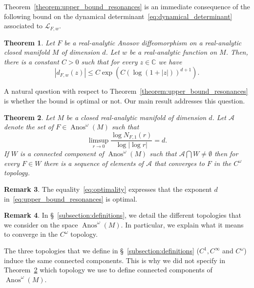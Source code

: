 \documentclass[10pt]{amsart}
\newtheorem{theo}{Theorem}[section]
\theoremstyle{definition}\newtheorem{defi}[theo]{Definition}\newtheorem{rema}[theo]{Remark}\newtheorem{exam}[theo]{Example}\newtheorem{exem}[theo]{Example}\newtheorem{nota}[theo]{Notation}
\DeclareMathOperator{\Anos}{Anos}
\newcommand{\p}[1]{\left(#1\right)}
\newcommand{\va}[1]{\left|#1\right|}
\newcommand{\clL}{\mathcal{L}}
\newcommand{\clA}{\mathcal{A}}
\newcommand{\bbC}{\mathbb{C}}
\begin{document}
Theorem~\ref{theorem:upper_bound_resonances} is an immediate consequence of the following bound on the dynamical determinant~\eqref{eq:dynamical_determinant} associated to $\clL_{F,w}$.

\begin{theo}\label{thm:upper_bound_determinant}
Let $F$ be a real-analytic Anosov diffeomorphism on a real-analytic closed manifold $M$ of dimension $d$. Let $w$ be a real-analytic function on $M$. Then, there is a constant $C > 0$ such that for every $z \in \bbC$ we have
\begin{equation*}
\va{d_{F,w}(z)} \leq C \exp\p{C\p{\log(1 + \va{z})}^{d+1}}.
\end{equation*}
\end{theo}

A natural question with respect to Theorem~\ref{theorem:upper_bound_resonances} is whether the bound is optimal or not. Our main result addresses this question.

\begin{theo}\label{theorem:optimal_dense}
Let $M$ be a closed real-analytic manifold of dimension $d$. Let $\clA$ denote the set of $F \in \Anos^\omega(M)$ such that
\begin{equation}\label{eq:optimality}
\limsup_{r \to 0} \frac{\log N_{F,1}(r)}{\log \va{\log r}} = d.
\end{equation}
If $W$ is a connected component of $\Anos^\omega(M)$ such that $\clA\bigcap W \neq \emptyset$ then for every $F \in W$ there is a sequence of elements of $\clA$ that converges to $F$ in the $C^\omega$ topology.
\end{theo}

\begin{rema}
The equality~\eqref{eq:optimality} expresses that the exponent $d$ in~\eqref{eq:upper_bound_resonances} is optimal.
\end{rema}

\begin{rema}
In \S~\ref{subsection:definitions}, we detail the different topologies that we consider on the space $\Anos^\omega(M)$. In particular, we explain what it means to converge in the $C^\omega$ topology.

The three topologies that we define in \S~\ref{subsection:definitions} ($C^1,C^\infty$ and $C^\omega$) induce the same connected components. This is why we did not specify in Theorem~\ref{theorem:optimal_dense} which topology we use to define connected components of $\Anos^\omega(M)$.
\end{rema}
\end{document}
